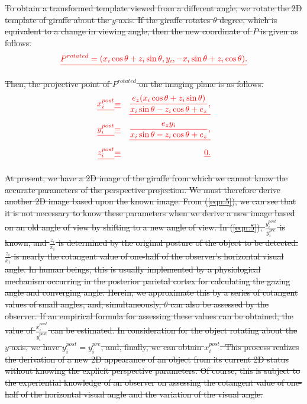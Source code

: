 \documentclass[journal]{IEEEtran}
\providecommand{\DIFdel}[1]{{\protect\color{red}\sout{#1}}}                      %
\begin{document}
\DIFdel{To obtain a transformed template viewed from a different angle,
we rotate the 2D template of giraffe about the $y$-axis.
If the giraffe rotates $\theta$ degree, which is equivalent to a change in viewing angle, 
then the new coordinate of $P$ is given as follows. 
}\begin{displaymath}\DIFdel{
P^{rotated}=(x_i \cos\theta+z_i \sin\theta,y_i,-x_i \sin\theta+z_i \cos\theta). 
}\end{displaymath}

\DIFdel{Then, the projective point of $P^{rotated}$ on the imaging plane is as follows.
}\begin{align*}\DIFdel{
x_i^{post}}&\DIFdel{=}&\DIFdel{\frac{e_z(x_i \cos\theta+z_i \sin\theta)}{x_i \sin\theta-z_i \cos\theta+e_z}, \nonumber}\\
\DIFdel{y_i^{post}}&\DIFdel{=}&\DIFdel{\frac{e_z y_i}{x_i \sin\theta-z_i \cos\theta+e_z}, \nonumber}\\
\DIFdel{z_i^{post}}&\DIFdel{=}&\DIFdel{0.
\label{eqn:4}
}\end{align*}

\DIFdel{At present, 
we have a 2D image of the giraffe from which we cannot know the accurate parameters of the perspective projection. 
We must therefore derive another 2D image based upon the known image. 
From (\ref{eqn:5}), we can see that it is not necessary to know these parameters when we derive a new image based on an old angle of view by shifting to a new angle of view. 
In (\ref{eqn:5}), $\frac{y_i^{post}}{y_i^{pre}}$ is known,
and $\frac{z_i}{x_i}$ is determined by the original posture of the object to be detected. 
$\frac{z_i}{x_i}$ is nearly the cotangent value of one-half of the observer's horizontal visual angle. 
In human beings, this is usually implemented by a physiological mechanism occurring in the posterior parietal cortex for calculating the gazing angle and converging angle. 
Herein, we approximate this by a series of cotangent values of small angles, 
and, simultaneously, $\theta$ can also be assessed by the observer. 
If an empirical formula for assessing these values can be obtained, 
the value of $\frac{x_i^{post}}{y_i^{post}}$ can be estimated. 
In consideration for the object rotating about the $y$-axis, we have $y_i^{post}=y_i^{pre}$, 
and, finally, we can obtain $x_i^{post}$. 
This process realizes the derivation of a new 2D appearance of an object from its current 2D status without knowing the explicit perspective parameters. 
Of course, this is subject to the experiential knowledge of an observer on assessing the cotangent value of one-half of the horizontal visual angle and the variation of the visual angle.
}%
\end{document}
